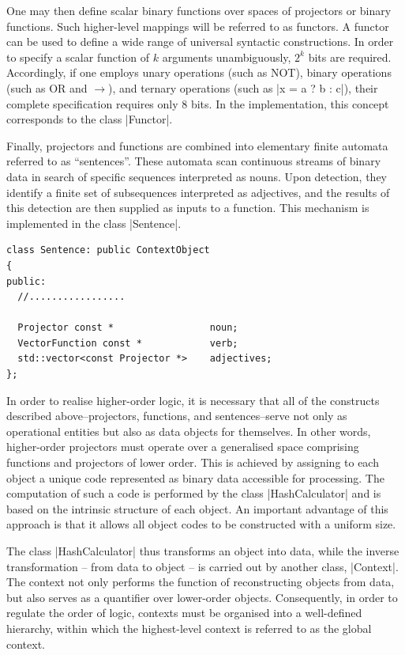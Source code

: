 \documentclass[12pt, a4paper]{article}
\begin{document}
One may then define scalar binary functions over spaces of projectors or 
binary functions. Such higher-level mappings will be referred to as functors. 
A functor can be used to define a wide range of universal syntactic constructions. 
In order to specify a scalar function of $k$ arguments unambiguously, $2^k$ bits 
are required. Accordingly, if one employs unary operations (such as NOT), binary 
operations (such as OR and $\to$)\cite{Material_conditional}, and ternary operations (such as 
|x = a ? b : c|)\cite{Ternary_conditional_operator}, their complete specification 
requires only 8 bits. In the implementation, this concept corresponds to the class |Functor|.

Finally, projectors and functions are combined into elementary finite automata referred to as 
``sentences''. These automata scan continuous streams of binary data in search of specific 
sequences interpreted as nouns. Upon detection, they identify a finite set of subsequences 
interpreted as adjectives, and the results of this detection are then supplied as inputs 
to a function. This mechanism is implemented in the class |Sentence|.



\begin{lstlisting}[caption=Sentence in pseucode]
class Sentence: public ContextObject
{
public:
  //.................

  Projector const *                 noun;
  VectorFunction const *            verb;
  std::vector<const Projector *>    adjectives;
};
\end{lstlisting}


In order to realise higher-order logic, it is necessary that all of the constructs described 
above--projectors, functions, and sentences--serve not only as operational entities but also 
as data objects for themselves. In other words, higher-order projectors must operate over 
a generalised space comprising functions and projectors of lower order. This is achieved 
by assigning to each object a unique code represented as binary data accessible for 
processing. The computation of such a code is performed by the class |HashCalculator| 
and is based on the intrinsic structure of each object. An important advantage of this 
approach is that it allows all object codes to be constructed with a uniform size.

The class |HashCalculator| thus transforms an object into data, while the inverse transformation 
-- from data to object -- is carried out by another class, |Context|. The context not only 
performs the function of reconstructing objects from data, but also serves as a quantifier 
over lower-order objects. Consequently, in order to regulate the order of logic, contexts 
must be organised into a well-defined hierarchy, within which the highest-level context is 
referred to as the global context.
\end{document}
